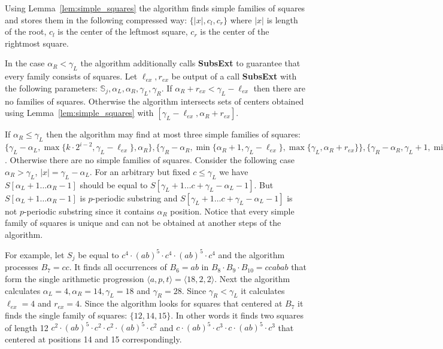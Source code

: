 \documentclass[11pt]{article}
\theoremstyle{break}
\newcommand{\prog}[3]{\langle #1, #2, #3\rangle}
\newcommand{\slp}[1]{\mathbb{#1}}
\newcommand{\substr}[2]{[#1\dots#2]}
\begin{document}
Using Lemma~\ref{lem:simple_squares} the algorithm finds simple families of squares and stores them in the following compressed way:
$\{|x|, c_l, c_r\}$ where $|x|$ is length of the root, $c_l$ is the center of the leftmost square, $c_r$
is the center of the rightmost square. 

In the case $\alpha_R < \gamma_L$ the algorithm additionally calls \textbf{SubsExt} to guarantee that every family consists of squares. 
Let $\ell_{ex}, r_{ex}$ be output of a call \textbf{SubsExt} with the following parameters: 
$\slp{S}_j, \alpha_L, \alpha_R, \gamma_L, \gamma_R$. If $\alpha_R + r_{ex} < \gamma_L - \ell_{ex}$ then there are no families of squares. 
Otherwise the algorithm intersects sets of centers obtained using Lemma~\ref{lem:simple_squares} with $[\gamma_L - \ell_{ex}, \alpha_R + r_{ex}]$.

If $\alpha_R \leq \gamma_L$ then the algorithm may find at most three simple families of
squares: $\{\gamma_L - \alpha_L, \max \{k \cdot 2^{i-2}, \gamma_L - \ell_{ex}\}, \alpha_R\}, \{\gamma_R - \alpha_R, 
\min \{\alpha_R + 1, \gamma_L - \ell_{ex}\}, \max \{\gamma_L, \alpha_R + r_{ex}\}\},
\{\gamma_R - \alpha_R,  \gamma_L + 1, \min\{a, \alpha_R + r_{ex}, (k+1) \cdot 2^{i-2} - 1\}\}$. Otherwise there are no simple families of squares. 
Consider the following case $\alpha_R > \gamma_L$, $|x| = \gamma_L - \alpha_L$. For an arbitrary but fixed $c \leq \gamma_L$ we have 
$S\substr{\alpha_L + 1}{\alpha_R -1}$ should be equal to $S\substr{\gamma_L + 1}{c + \gamma_L - \alpha_L -1}$. But 
$S\substr{\alpha_L + 1}{\alpha_R -1}$ is $p$-periodic substring and $S\substr{\gamma_L + 1}{c + \gamma_L - \alpha_L -1}$ is not $p$-periodic
substring since it contains $\alpha_R$ position. Notice that every simple family of squares is unique and can not be obtained at another 
steps of the algorithm.

For example, let $S_j$ be equal to $c^4 \cdot (ab)^5 \cdot c^4 \cdot (ab)^5 \cdot c^4$ and the algorithm processes $B_7 = cc$. It finds all 
occurrences of $B_6 = ab$ in $B_8 \cdot B_9 \cdot B_{10} = ccabab$ that form the single arithmetic progression $\prog{a}{p}{t} = \prog{18}{2}{2}$. 
Next the algorithm calculates $\alpha_L = 4, \alpha_R = 14, \gamma_L = 18$ and $\gamma_R = 28$. Since $\gamma_R < \gamma_L$ it calculates 
$\ell_{ex} = 4$ and $r_{ex} = 4$. Since the algorithm looks for squares that centered at $B_7$ it finds the single family of squares: $\{12, 14, 15\}$.
In other words it finds two squares of length 12 $c^2 \cdot (ab)^5 \cdot c^2 \cdot c^2 \cdot (ab)^5 \cdot c^2$ and 
$c \cdot (ab)^5 \cdot c^3 \cdot c \cdot (ab)^5 \cdot c^3$ that centered at positions 14 and 15 correspondingly.
\end{document}
